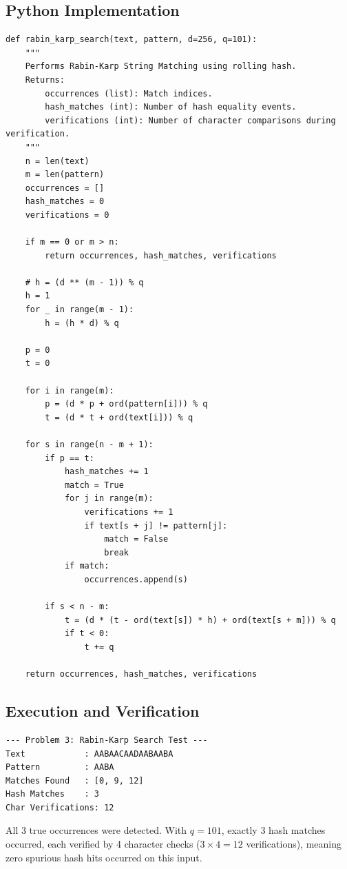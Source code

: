 \documentclass[12pt]{article}
\begin{document}
\subsection{Python Implementation}
\begin{lstlisting}[style=code, caption={Rabin-Karp Search with Verification Tracking}]
def rabin_karp_search(text, pattern, d=256, q=101):
    """
    Performs Rabin-Karp String Matching using rolling hash.
    Returns:
        occurrences (list): Match indices.
        hash_matches (int): Number of hash equality events.
        verifications (int): Number of character comparisons during verification.
    """
    n = len(text)
    m = len(pattern)
    occurrences = []
    hash_matches = 0
    verifications = 0

    if m == 0 or m > n:
        return occurrences, hash_matches, verifications

    # h = (d ** (m - 1)) % q
    h = 1
    for _ in range(m - 1):
        h = (h * d) % q

    p = 0
    t = 0

    for i in range(m):
        p = (d * p + ord(pattern[i])) % q
        t = (d * t + ord(text[i])) % q

    for s in range(n - m + 1):
        if p == t:
            hash_matches += 1
            match = True
            for j in range(m):
                verifications += 1
                if text[s + j] != pattern[j]:
                    match = False
                    break
            if match:
                occurrences.append(s)

        if s < n - m:
            t = (d * (t - ord(text[s]) * h) + ord(text[s + m])) % q
            if t < 0:
                t += q

    return occurrences, hash_matches, verifications
\end{lstlisting}

\subsection{Execution and Verification}
\begin{lstlisting}[style=output, caption={Rabin-Karp Search Output}]
--- Problem 3: Rabin-Karp Search Test ---
Text            : AABAACAADAABAABA
Pattern         : AABA
Matches Found   : [0, 9, 12]
Hash Matches    : 3
Char Verifications: 12
\end{lstlisting}
All 3 true occurrences were detected. With $q = 101$, exactly 3 hash matches occurred, each verified by 4 character checks ($3 \times 4 = 12$ verifications), meaning zero spurious hash hits occurred on this input.
\end{document}
